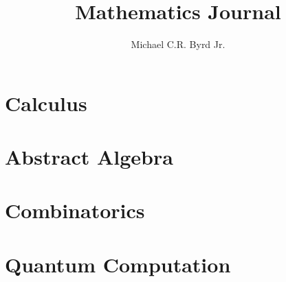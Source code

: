 \documentclass[11pt,letterpaper, oneside]{book}
\title{Mathematics Journal}
\author{Michael C.R. Byrd Jr.}
\theoremstyle{plain}
\theoremstyle{remark}
\theoremstyle{definition}
\begin{document}
	
	\maketitle
	
	\tableofcontents	

	
	

	
	\part{Calculus}
	
	
	\part{Abstract Algebra}
	
	
	\part{Combinatorics}
	
	
	\part{Quantum Computation}
	
\end{document}
